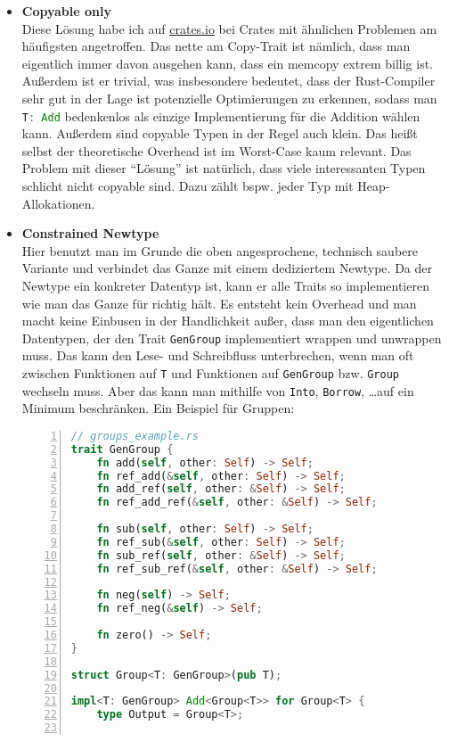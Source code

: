 \documentclass[12pt]{article}
\begin{document}
\begin{itemize}
\item \textbf{Copyable only}\\
Diese Lösung habe ich auf \href{https://crates.io}{crates.io} bei Crates mit ähnlichen Problemen am häufigsten angetroffen. Das nette am Copy-Trait ist nämlich, dass man eigentlich immer davon ausgehen kann, dass ein memcopy extrem billig ist. Außerdem ist er trivial, was insbesondere bedeutet, dass der Rust-Compiler sehr gut in der Lage ist potenzielle Optimierungen zu erkennen, sodass man \lstinline[language=Rust]|T: Add| bedenkenlos als einzige Implementierung für die Addition wählen kann. Außerdem sind copyable Typen in der Regel auch klein. Das heißt selbst der theoretische Overhead ist im Worst-Case kaum relevant. Das Problem mit dieser ``Lösung'' ist natürlich, dass viele interessanten Typen schlicht nicht copyable sind. Dazu zählt bspw. jeder Typ mit Heap-Allokationen.
\item \textbf{Constrained Newtype}\\
Hier benutzt man im Grunde die oben angesprochene, technisch saubere Variante und verbindet das Ganze mit einem dediziertem Newtype. Da der Newtype ein konkreter Datentyp ist, kann er alle Traits so implementieren wie man das Ganze für richtig hält. Es entsteht kein Overhead und man macht keine Einbusen in der Handlichkeit außer, dass man den eigentlichen Datentypen, der den Trait \texttt{GenGroup} implementiert wrappen und unwrappen muss. Das kann den Lese- und Schreibfluss unterbrechen, wenn man oft zwischen Funktionen auf \texttt{T} und Funktionen auf \texttt{GenGroup} bzw. \texttt{Group} wechseln muss. Aber das kann man mithilfe von \texttt{Into}, \texttt{Borrow}, \dots auf ein Minimum beschränken. Ein Beispiel für Gruppen:
\begin{lstlisting}[language=Rust, numbers=left]
// groups_example.rs
trait GenGroup {
	fn add(self, other: Self) -> Self;
	fn ref_add(&self, other: Self) -> Self;
	fn add_ref(self, other: &Self) -> Self;
	fn ref_add_ref(&self, other: &Self) -> Self;
	
	fn sub(self, other: Self) -> Self;
	fn ref_sub(&self, other: Self) -> Self;
	fn sub_ref(self, other: &Self) -> Self;
	fn ref_sub_ref(&self, other: &Self) -> Self;
	
	fn neg(self) -> Self;
	fn ref_neg(&self) -> Self;
	
	fn zero() -> Self;
}

struct Group<T: GenGroup>(pub T);

impl<T: GenGroup> Add<Group<T>> for Group<T> {
	type Output = Group<T>;
	

\end{lstlisting}
\end{itemize}
\end{document}
